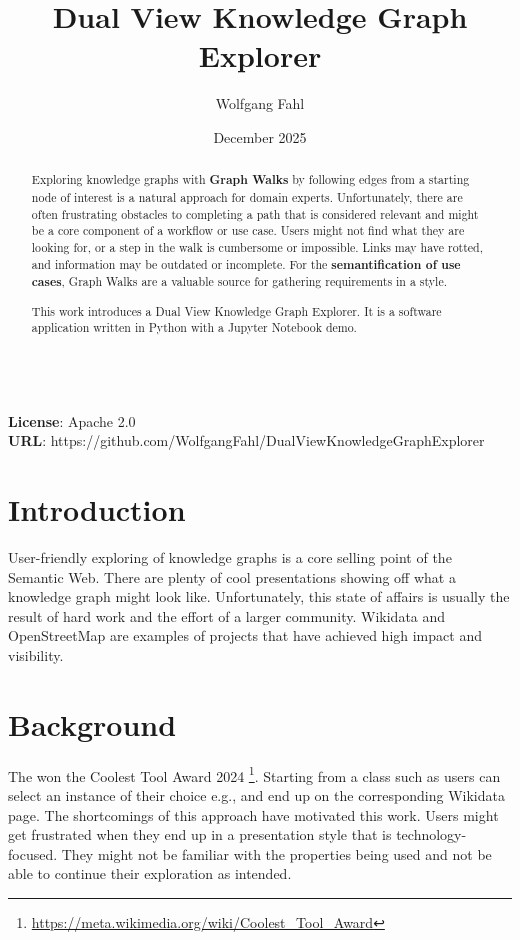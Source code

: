 \documentclass[runningheads]{llncs}
\title{Dual View Knowledge Graph Explorer}
\author{
     {Wolfgang Fahl}\inst{1}\orcidID{0000-0002-0821-6995}
}
\institute{
{BITPlan GmbH, Willich, Germany}
}
\date{December 2025}
\begin{document}
\maketitle
\begin{abstract}
Exploring knowledge graphs with \textbf{Graph Walks} by following edges from a starting node of interest is a natural approach for domain experts. Unfortunately, there are often frustrating obstacles to completing a path that is considered relevant and might be a core component of a workflow or use case. Users might not find what they are looking for, or a step in the walk is cumbersome or impossible. Links may have rotted, and information may be outdated or incomplete. For the \textbf{semantification of use cases}, Graph Walks are a valuable source for gathering requirements in a  style.

This work introduces a Dual View Knowledge Graph Explorer. It is a software application written in Python with a Jupyter Notebook demo.
\end{abstract}
\\
\noindent
\textbf{License}: Apache 2.0
\\
\textbf{URL}: https://github.com/WolfgangFahl/DualViewKnowledgeGraphExplorer
\section{Introduction}
User-friendly exploring of knowledge graphs is a core selling point of the Semantic Web. There are plenty of cool presentations showing off what a knowledge graph might look like. Unfortunately, this state of affairs is usually the result of hard work and the effort of a larger community. Wikidata \cite{Vrandecic2014} and OpenStreetMap \cite{Haklay2008} are examples of projects that have achieved high impact and visibility.
\section{Background}
The  won the Coolest Tool Award 2024 \footnote{\url{https://meta.wikimedia.org/wiki/Coolest_Tool_Award}}. Starting from a class such as  users can select an instance of their choice e.g.,  and end up on the corresponding Wikidata page. The shortcomings of this approach have motivated this work. Users might get frustrated when they end up in a presentation style that is technology-focused. They might not be familiar with the properties being used and not be able to continue their exploration as intended.
\end{document}

